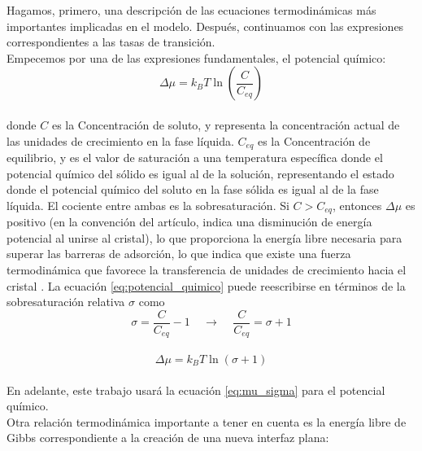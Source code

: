\documentclass[12pt,letterpaper,oneside]{report}
\begin{document}
Hagamos, primero, una descripción de las ecuaciones termodinámicas más importantes implicadas en el modelo. Después, continuamos con las expresiones correspondientes a las tasas de transición.\\

Empecemos por una de las expresiones fundamentales, el potencial químico:\\

\begin{equation}
    \Delta\mu = k_BT\ln\left(\frac{C}{C_{eq}}\right)
    \label{eq:potencial_quimico}
\end{equation}\\

\noindent donde $C$ es la Concentración de soluto, y representa la concentración actual de las unidades de crecimiento en la fase líquida. $C_{eq}$ es la Concentración de equilibrio, y es el valor de saturación a una temperatura específica donde el potencial químico del sólido es igual al de la solución, representando el estado donde el potencial químico del soluto en la fase sólida es igual al de la fase líquida. El cociente entre ambas es la sobresaturación. Si $C > C_{eq}$, entonces $\Delta\mu$ es positivo (en la convención del artículo, indica una disminución de energía potencial al unirse al cristal), lo que proporciona la energía libre necesaria para superar las barreras de adsorción, lo que indica que existe una fuerza termodinámica que favorece la transferencia de unidades de crecimiento hacia el cristal \cite{Nagpal2024}. La ecuación \eqref{eq:potencial_quimico} puede reescribirse en términos de la sobresaturación relativa $\sigma$ como\\

\begin{equation*}
    \sigma = \frac{C}{C_{eq}}-1 ~~~~~\xrightarrow{}~~~~~ \frac{C}{C_{eq}} = \sigma + 1
\end{equation*}\\

\begin{equation}
\Delta\mu = k_BT\ln{\left(\sigma + 1\right)}
\label{eq:mu_sigma}
\end{equation}\\

En adelante, este trabajo usará la ecuación \eqref{eq:mu_sigma} para el potencial químico.\\

Otra relación termodinámica importante a tener en cuenta es la energía libre de Gibbs correspondiente a la creación de una nueva interfaz plana:\\
\end{document}
